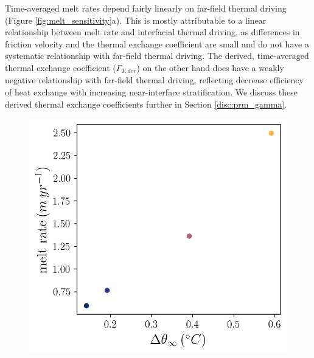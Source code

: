 \documentclass[draft]{agujournal2019}
\begin{document}
Time-averaged melt rates depend fairly linearly on far-field thermal driving (Figure \ref{fig:melt_sensitivity}a). This is mostly attributable to a linear relationship between melt rate and interfacial thermal driving, as differences in friction velocity and the thermal exchange coefficient are small and do not have a systematic relationship with far-field thermal driving. 
The derived, time-averaged thermal exchange coefficient ($\Gamma_{T,der}$) on the other hand does have a weakly negative relationship with far-field thermal driving, reflecting decrease efficiency of heat exchange with increasing near-interface stratification. We discuss these derived thermal exchange coefficients further in Section \ref{disc:prm_gamma}.

\begin{figure}[h!]
    \centering
    \begin{minipage}{0.5\textwidth}
        \includegraphics[trim={0 0 0 0},clip,width=\textwidth]{Figures/melt_dT_cmp_dT_43h_tav13h.png}
    \end{minipage}%
    \begin{minipage}{0.5\textwidth}

\end{minipage}
\end{figure}
\end{document}
